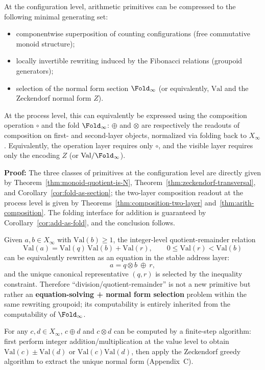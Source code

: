 \begin{corollary}\label{cor:primitive-free-arith}
At the configuration level, arithmetic primitives can be compressed to the following minimal generating set:
\begin{itemize}
  \item componentwise superposition of counting configurations (free commutative monoid structure);
  \item locally invertible rewriting induced by the Fibonacci relations (groupoid generators);
  \item selection of the normal form section $\Fold_\infty$ (or equivalently, $\mathrm{Val}$ and the Zeckendorf normal form $Z$).
\end{itemize}
At the process level, this can equivalently be expressed using the composition operation $\circ$ and the fold $\Fold_\infty$: $\oplus$ and $\otimes$ are respectively the readouts of composition on first- and second-layer objects, normalized via folding back to $X_\infty$.
Equivalently, the operation layer requires only $\circ$, and the visible layer requires only the encoding $Z$ (or $\mathrm{Val}/\Fold_\infty$).
\end{corollary}

\textbf{Proof:}
The three classes of primitives at the configuration level are directly given by Theorem~\ref{thm:monoid-quotient-is-N}, Theorem~\ref{thm:zeckendorf-transversal}, and Corollary~\ref{cor:fold-as-section}; the two-layer composition readout at the process level is given by Theorems~\ref{thm:composition-two-layer} and~\ref{thm:arith-composition}. The folding interface for addition is guaranteed by Corollary~\ref{cor:add-as-fold}, and the conclusion follows.

\begin{remark}\label{rem:division-as-selection}
Given $a,b\in X_\infty$ with $\mathrm{Val}(b)\ge 1$, the integer-level quotient-remainder relation
\[
\mathrm{Val}(a)=\mathrm{Val}(q)\,\mathrm{Val}(b)+\mathrm{Val}(r),\qquad 0\le \mathrm{Val}(r)<\mathrm{Val}(b)
\]
can be equivalently rewritten as an equation in the stable address layer:
\[
a=q\otimes b\ \oplus\ r,
\]
and the unique canonical representative $(q,r)$ is selected by the inequality constraint. Therefore ``division/quotient-remainder'' is not a new primitive but rather an \textbf{equation-solving + normal form selection} problem within the same rewriting groupoid; its computability is entirely inherited from the computability of $\Fold_\infty$.
\end{remark}

\begin{proposition}\label{prop:zeckendorf-arith-computable}
For any $c,d\in X_\infty$, $c\oplus d$ and $c\otimes d$ can be computed by a finite-step algorithm: first perform integer addition/multiplication at the value level to obtain $\mathrm{Val}(c)\pm\mathrm{Val}(d)$ or $\mathrm{Val}(c)\mathrm{Val}(d)$, then apply the Zeckendorf greedy algorithm to extract the unique normal form (Appendix~C).
\end{proposition}
